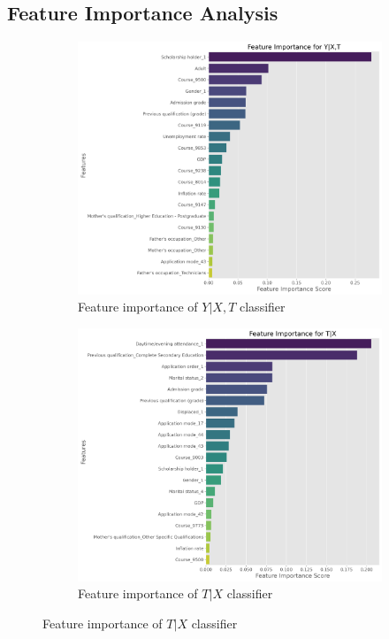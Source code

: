 \documentclass{article}
\begin{document}
\subsection{Feature Importance Analysis}

\begin{figure}
    \centering
    \caption{Important features of classifiers}
    \label{fig:feature_importance}
    \begin{subfigure}[b]{0.45\textwidth}
        \centering
        \includegraphics[width=\textwidth]{plots/feature_importance_y_given_xt.png}
        \caption{Feature importance of $Y | X, T$ classifier}
        \label{fig:feature_importance_y_given_xt}
    \end{subfigure}
    \hfill
    \begin{subfigure}[b]{0.45\textwidth}
        \centering
        \includegraphics[width=\textwidth]{plots/feature_importance_t_given_x.png}
        \caption{Feature importance of $T | X$ classifier}
        \label{fig:feature_importance_t_given_x}
    \end{subfigure}
\end{figure}
\end{document}
